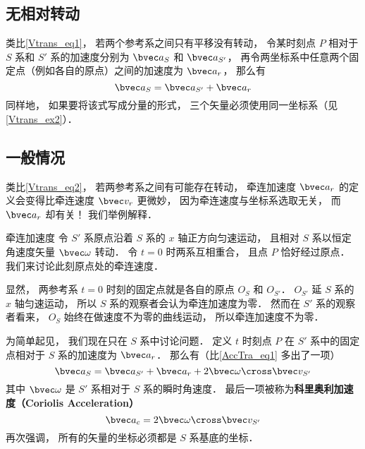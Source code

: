 

\subsection{无相对转动}
类比\autoref{Vtrans_eq1}， 若两个参考系之间只有平移没有转动， 令某时刻点 $P$ 相对于 $S$ 系和 $S'$ 系的加速度分别为 $\bvec a_S$ 和 $\bvec a_{S'}$， 再令两坐标系中任意两个固定点（例如各自的原点）之间的加速度为 $\bvec a_r$， 那么有
\begin{equation}\label{AccTra_eq1}
\bvec a_S = \bvec a_{S'} + \bvec a_r
\end{equation}
同样地， 如果要将该式写成分量的形式， 三个矢量必须使用同一坐标系（见\autoref{Vtrans_ex2}）．

\subsection{一般情况}
类比\autoref{Vtrans_eq2}， 若两参考系之间有可能存在转动， 牵连加速度 $\bvec a_{r}$ 的定义会变得比牵连速度 $\bvec v_r$ 更微妙， 因为牵连速度与坐标系选取无关， 而 $\bvec a_{r}$ 却有关！ 我们举例解释．

\begin{example}{牵连加速度}
令 $S'$ 系原点沿着 $S$ 系的 $x$ 轴正方向匀速运动， 且相对 $S$ 系以恒定角速度矢量 $\bvec \omega$ 转动． 令 $t = 0$ 时两系互相重合， 且点 $P$ 恰好经过原点． 我们来讨论此刻原点处的牵连速度．

显然， 两参考系 $t = 0$ 时刻的固定点就是各自的原点 $O_S$ 和 $O_{S'}$． $O_{S'}$ 延 $S$ 系的 $x$ 轴匀速运动， 所以 $S$ 系的观察者会认为牵连加速度为零． 然而在 $S'$ 系的观察者看来， $O_S$ 始终在做速度不为零的曲线运动， 所以牵连加速度不为零．
\end{example}

为简单起见， 我们现在只在 $S$ 系中讨论问题． 定义 $t$ 时刻点 $P$ 在 $S'$ 系中的固定点相对于 $S$ 系的加速度为 $\bvec a_{r}$． 那么有（比\autoref{AccTra_eq1} 多出了一项）
\begin{equation}\label{AccTra_eq2}
\bvec a_S = \bvec a_{S'} + \bvec a_{r} + 2 \bvec \omega \cross \bvec v_{S'}
\end{equation}
其中 $\bvec \omega$ 是 $S'$ 系相对于 $S$ 系的瞬时角速度． 最后一项被称为\textbf{科里奥利加速度（Coriolis Acceleration）}
\begin{equation}
\bvec a_c = 2 \bvec \omega \cross \bvec v_{S'}
\end{equation}
再次强调， 所有的矢量的坐标必须都是 $S$ 系基底的坐标．

